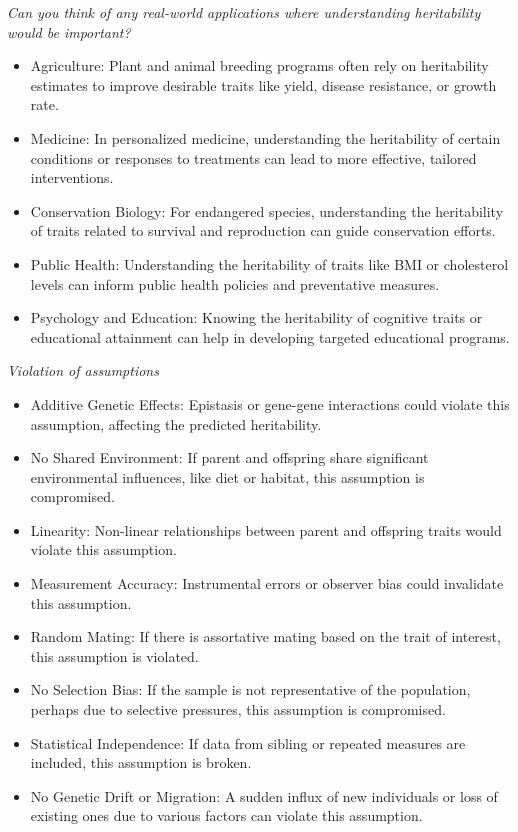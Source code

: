 \documentclass[
  a4paper]{book}
\providecommand{\tightlist}{%
  \setlength{\itemsep}{0pt}\setlength{\parskip}{0pt}}
\begin{document}
\emph{Can you think of any real-world applications where understanding heritability would be important?}

\begin{itemize}
\tightlist
\item
  Agriculture: Plant and animal breeding programs often rely on heritability estimates to improve desirable traits like yield, disease resistance, or growth rate.
\item
  Medicine: In personalized medicine, understanding the heritability of certain conditions or responses to treatments can lead to more effective, tailored interventions.
\item
  Conservation Biology: For endangered species, understanding the heritability of traits related to survival and reproduction can guide conservation efforts.
\item
  Public Health: Understanding the heritability of traits like BMI or cholesterol levels can inform public health policies and preventative measures.
\item
  Psychology and Education: Knowing the heritability of cognitive traits or educational attainment can help in developing targeted educational programs.
\end{itemize}

\emph{Violation of assumptions}

\begin{itemize}
\tightlist
\item
  Additive Genetic Effects: Epistasis or gene-gene interactions could violate this assumption, affecting the predicted heritability.
\item
  No Shared Environment: If parent and offspring share significant environmental influences, like diet or habitat, this assumption is compromised.
\item
  Linearity: Non-linear relationships between parent and offspring traits would violate this assumption.
\item
  Measurement Accuracy: Instrumental errors or observer bias could invalidate this assumption.
\item
  Random Mating: If there is assortative mating based on the trait of interest, this assumption is violated.
\item
  No Selection Bias: If the sample is not representative of the population, perhaps due to selective pressures, this assumption is compromised.
\item
  Statistical Independence: If data from sibling or repeated measures are included, this assumption is broken.
\item
  No Genetic Drift or Migration: A sudden influx of new individuals or loss of existing ones due to various factors can violate this assumption.
\end{itemize}
\end{document}
